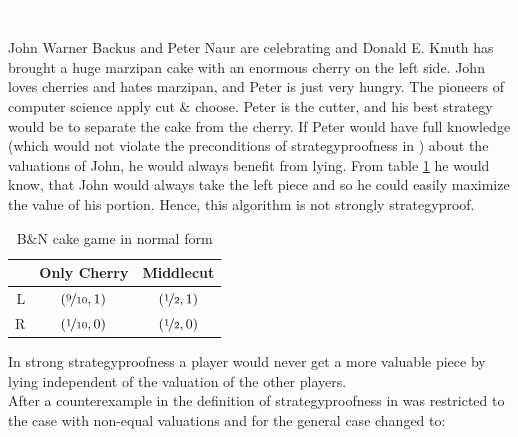 \begin{bsp}
\label{bsp3}
\textcolor{white}{x}\\\\
John Warner Backus and Peter Naur are celebrating and Donald E. Knuth has brought a huge marzipan cake with an enormous cherry on the left side. John loves cherries and hates marzipan, and Peter is just very hungry. The pioneers of computer science apply cut $\&$ choose. Peter is the cutter, and his best strategy would be to separate the cake from the cherry. If Peter would have full knowledge (which would not violate the preconditions of strategyproofness in \cite{why}) about the valuations of John, he would always benefit from lying. From table \ref{Table4} he would know, that John would always take the left piece and so he could easily maximize the value of his portion. Hence, this algorithm is not strongly strategyproof.  
\end{bsp}
\begin{table}[htb]
\centering
 \renewcommand{\arraystretch}{1.2} 
\begin{tabular}{c|c|c|}
\cline{2-3}
&\multicolumn{1}{|c|}{{Only Cherry}}& {Middlecut}\\
\hline
\multicolumn{1}{|r|}{{L}}&$\left(\nicefrac{9}{10}, 1\right)$&$\left(\nicefrac{1}{2}, 1\right)$\\
\hline
\multicolumn{1}{|r|}{{R}}&$\left(\nicefrac{1}{10}, 0\right)$&$\left(\nicefrac{1}{2}, 0\right)$\\
\hline
\end{tabular}
\caption{B$\&$N cake game in normal form}\label{Table4}
\end{table}
In strong strategyproofness a player would never get a more valuable piece by lying independent of the valuation of the other players.\\
\newline
After a counterexample in \cite{ccc} the definition of strategyproofness in \cite{pie} was restricted to the case with non-equal valuations and for the general case changed to:

